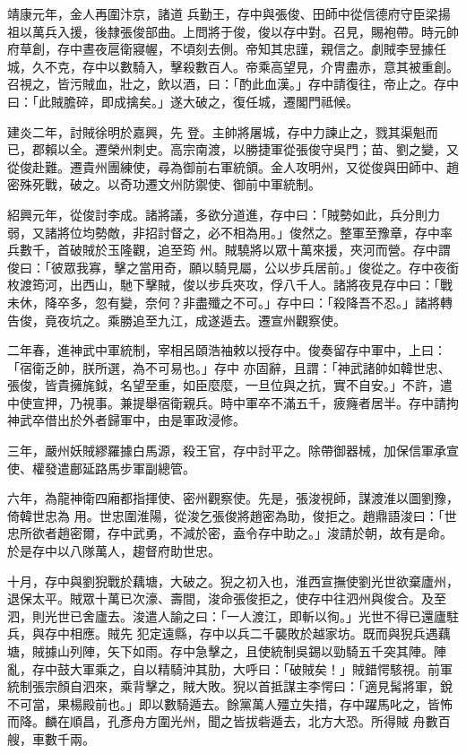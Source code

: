 \begin{pinyinscope}
 靖康元年，金人再圍汴京，諸道
 兵勤王，存中與張俊、田師中從信德府守臣梁揚祖以萬兵入援，後隸張俊部曲。上問將于俊，俊以存中對。召見，賜袍帶。時元帥府草創，存中晝夜扈衛寢幄，不頃刻去側。帝知其忠謹，親信之。劇賊李昱據任城，久不克，存中以數騎入，擊殺數百人。帝乘高望見，介冑盡赤，意其被重創。召視之，皆污賊血，壯之，飲以酒，曰：「酌此血漢。」存中請復往，帝止之。存中曰：「此賊膽碎，即成擒矣。」遂大破之，復任城，遷閣門祗候。



 建炎二年，討賊徐明於嘉興，先
 登。主帥將屠城，存中力諫止之，戮其渠魁而已，郡賴以全。遷榮州刺史。高宗南渡，以勝捷軍從張俊守吳門；苗、劉之變，又從俊赴難。遷貴州團練使，尋為御前右軍統領。金人攻明州，又從俊與田師中、趙密殊死戰，破之。以奇功遷文州防禦使、御前中軍統制。



 紹興元年，從俊討李成。諸將議，多欲分道進，存中曰：「賊勢如此，兵分則力弱，又諸將位均勢敵，非招討督之，必不相為用。」俊然之。整軍至豫章，存中率兵數千，首破賊於玉隆觀，追至筠
 州。賊驍將以眾十萬來援，夾河而營。存中謂俊曰：「彼眾我寡，擊之當用奇，願以騎見屬，公以步兵居前。」俊從之。存中夜銜枚渡筠河，出西山，馳下擊賊，俊以步兵夾攻，俘八千人。諸將夜見存中曰：「戰未休，降卒多，忽有變，奈何？非盡殲之不可。」存中曰：「殺降吾不忍。」諸將轉告俊，竟夜坑之。乘勝追至九江，成遂遁去。遷宣州觀察使。



 二年春，進神武中軍統制，宰相呂頤浩袖敕以授存中。俊奏留存中軍中，上曰：「宿衛乏帥，朕所選，為不可易也。」存中
 亦固辭，且謂：「神武諸帥如韓世忠、張俊，皆貴擁旄鉞，名望至重，如臣麼麼，一旦位與之抗，實不自安。」不許，遣中使宣押，乃視事。兼提舉宿衛親兵。時中軍卒不滿五千，疲癃者居半。存中請拘神武卒借出於外者歸軍中，由是軍政浸修。



 三年，嚴州妖賊繆羅據白馬源，殺王官，存中討平之。除帶御器械，加保信軍承宣使、權發遣鄜延路馬步軍副總管。



 六年，為龍神衛四廂都指揮使、密州觀察使。先是，張浚視師，謀渡淮以圖劉豫，倚韓世忠為
 用。世忠圍淮陽，從浚乞張俊將趙密為助，俊拒之。趙鼎語浚曰：「世忠所欲者趙密爾，存中武勇，不減於密，盍令存中助之。」浚請於朝，故有是命。於是存中以八隊萬人，趨督府助世忠。



 十月，存中與劉猊戰於藕塘，大破之。猊之初入也，淮西宣撫使劉光世欲棄廬州，退保太平。賊眾十萬已次濠、壽間，浚命張俊拒之，使存中往泗州與俊合。及至泗，則光世已舍廬去。浚遣人諭之曰：「一人渡江，即斬以徇。」光世不得已還廬駐兵，與存中相應。賊先
 犯定遠縣，存中以兵二千襲敗於越家坊。既而與猊兵遇藕塘，賊據山列陣，矢下如雨。存中急擊之，且使統制吳錫以勁騎五千突其陣。陣亂，存中鼓大軍乘之，自以精騎沖其肋，大呼曰：「破賊矣！」賊錯愕駭視。前軍統制張宗顏自泗來，乘背擊之，賊大敗。猊以首抵謀主李愕曰：「適見髯將軍，銳不可當，果楊殿前也。」即以數騎遁去。餘黨萬人殭立失措，存中躍馬叱之，皆怖而降。麟在順昌，孔彥舟方圍光州，聞之皆拔砦遁去，北方大恐。所得賊
 舟數百艘，車數千兩。




\end{pinyinscope}

